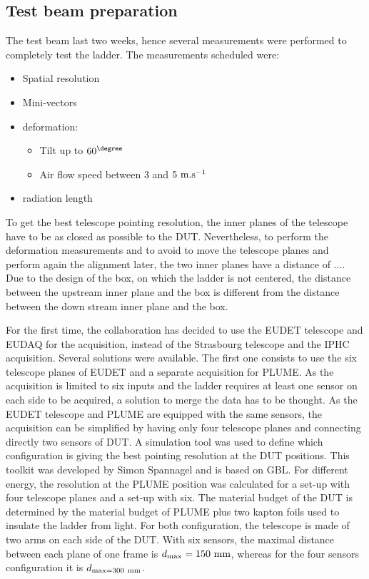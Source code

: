     \subsection{Test beam preparation}

    The test beam last two weeks, hence several measurements were performed to completely test the ladder.
    The measurements scheduled were: 
    \begin{itemize}
      \item Spatial resolution
      \item Mini-vectors
      \item deformation:
      \begin{itemize}
        \item Tilt up to $60^{\degree}$
        \item Air flow speed between 3 and $5~\rm{m.s}^{-1}$
      \end{itemize}
      \item radiation length
    \end{itemize}

    To get the best telescope pointing resolution, the inner planes of the telescope have to be as closed as possible to the \gls{DUT}.
    Nevertheless, to perform the deformation measurements and to avoid to move the telescope planes and perform again the alignment later, the two inner planes have a distance of .... 
    Due to the design of the box, on which the ladder is not centered, the distance between the upstream inner plane and the box is different from the distance between the down stream inner plane and the box.

    For the first time, the collaboration has decided to use the EUDET telescope and EUDAQ for the acquisition, instead of the Strasbourg telescope and the IPHC acquisition.
    Several solutions were available.
    The first one consists to use the six telescope planes of EUDET and a separate acquisition for \gls{PLUME}.
    As the acquisition is limited to six inputs and the ladder requires at least one sensor on each side to be acquired, a solution to merge the data has to be thought.
    As the EUDET telescope and \gls{PLUME} are equipped with the same sensors, the acquisition can be simplified by having only four telescope planes and connecting directly two sensors of \gls{DUT}.
    A simulation tool was used to define which configuration is giving the best pointing resolution at the \gls{DUT} positions.
    This toolkit was developed by Simon Spannagel and is based on GBL.
    For different energy, the resolution at the PLUME position was calculated for a set-up with four telescope planes and a set-up with six.
    The material budget of the \gls{DUT} is determined by the material budget of \gls{PLUME} plus two kapton foils used to insulate the ladder from light.
    For both configuration, the telescope is made of two arms on each side of the \gls{DUT}.
    With six sensors, the maximal distance between each plane of one frame is $d_{\rm{max}} = 150~\rm{mm}$, whereas for the four sensors configuration it is $d_{\rm{max} = 300~\rm{mm}}$.

